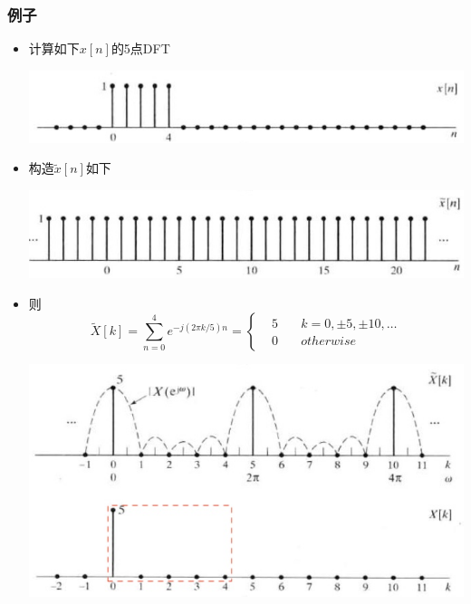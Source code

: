 \documentclass[CJKutf8,dvipsnames,table]{beamer}
\begin{document}
\begin{CJK*}{UTF8}{song}
  \begin{frame}
    \frametitle{例子}
    \begin{itemize}
	\item 计算如下$x[n]$的5点DFT
		\begin{center}
      	\includegraphics[scale=.25]{dtsp-c-f8-10a}
    	\end{center}
	\item 构造$\tilde{x}[n]$如下
		\begin{center}
      	\includegraphics[scale=.25]{dtsp-c-f8-10b}
    	\end{center}	
	\item 则
	\[
\tilde{X}[k] = \sum_{n=0}^{4} e^{-j(2\pi k/5)n} = 
\left\{
    \begin {aligned}
         & 5 \quad & k = 0, \pm5, \pm 10, \hdots \\
         & 0 \quad & otherwise
    \end{aligned}
\right.			
	\]
		\begin{center}
      	\includegraphics[scale=.28]{dtsp-c-f8-10cd}
    	\end{center}	
	\end{itemize}
  \end{frame}   
  

\end{CJK*}
\end{document}
